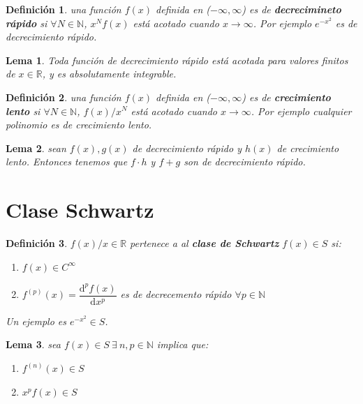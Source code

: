 \documentclass[12pt]{book}
\newcommand{\D}{\mathrm{d}}
\newtheorem{lemma}{Lema}[section]
\newtheorem{definicion}{Definición}[section]
\begin{document}
\begin{definicion}
una función $f(x)$ definida en ($-\infty, \infty$) es de \textbf{decrecimineto rápido} si $\forall N \in \mathbb{N}$, $x^N f(x)$ está acotado cuando $x \rightarrow \infty $. Por ejemplo $e^{-x^2}$ es de decrecimiento rápido.
\end{definicion}

\begin{lemma}
Toda función de decrecimiento rápido está acotada para valores finitos de $x \in \mathbb{R}$, y es absolutamente integrable.
\end{lemma}

\begin{definicion}
una función $f(x)$ definida en ($-\infty, \infty$) es de \textbf{crecimiento lento} si $\forall N \in \mathbb{N}$, $f(x)/x^N $ está acotado cuando $x \rightarrow \infty $. Por ejemplo cualquier polinomio es de crecimiento lento.
\end{definicion}

\begin{lemma}
sean $f(x), g(x)$ de decrecimiento rápido y $h(x)$ de crecimiento lento. Entonces tenemos que $f \cdot h$ y $f + g$ son de decrecimiento rápido. 
\end{lemma}



\section{Clase Schwartz}



\begin{definicion}
$f(x) / x  \in \mathbb{R}$ pertenece a al \textbf{clase de Schwartz} $f (x) \in S$ si:
\begin{enumerate}
\item $f(x) \in C^{\infty}$
\item $f^{(p)}(x) = \dfrac{\D^p f(x)}{\D x^p}$ es de decrecemento rápido $\forall p \in \mathbb{N}$
\end{enumerate}
Un ejemplo es $e^{-x^2} \in S$.
\end{definicion}

\begin{lemma}
sea $f(x) \in S \ \exists \ n,p \in  \mathbb{N}$ implica que:
\begin{enumerate}
\item $f^{(n)} (x) \in S$
\item $x^p f(x) \in S$
\end{enumerate} 
\end{lemma}
\end{document}
